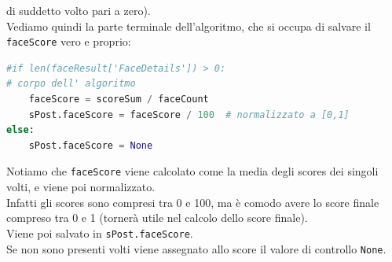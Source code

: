 di suddetto volto pari a zero).\\
Vediamo quindi la parte terminale dell'algoritmo, che si occupa di salvare il \verb+faceScore+ vero e proprio:
\begin{lstlisting}[language=Python]
#if len(faceResult['FaceDetails']) > 0: 
# corpo dell' algoritmo 
    faceScore = scoreSum / faceCount 
    sPost.faceScore = faceScore / 100  # normalizzato a [0,1]
else:
    sPost.faceScore = None
\end{lstlisting}
Notiamo che \verb+faceScore+ viene calcolato come la media degli scores dei singoli volti, e viene poi
normalizzato. \\
Infatti gli scores sono compresi tra 0 e 100, ma è comodo avere lo score finale compreso
tra 0 e 1 (tornerà utile nel calcolo dello score finale). \\
Viene poi salvato in \verb+sPost.faceScore+. \\
Se non sono presenti volti viene assegnato allo score il valore di controllo \verb+None+.

